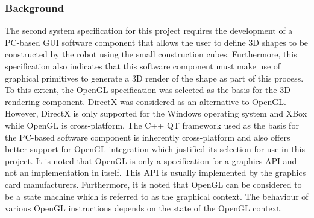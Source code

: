 \subsubsection{Background}

The second system specification for this project requires the development of a PC-based GUI software component that allows the user to define 3D shapes to be constructed by the robot using the small construction cubes. Furthermore, this specification also indicates that this software component must make use of graphical primitives to generate a 3D render of the shape as part of this process. To this extent, the OpenGL specification was selected as the basis for the 3D rendering component. DirectX was considered as an alternative to OpenGL. However, DirectX is only supported for the Windows operating system and XBox while OpenGL is cross-platform. The C++ QT framework used as the basis for the PC-based software component is inherently cross-platform and also offers better support for OpenGL integration which justified its selection for use in this project. It is noted that OpenGL is only a specification for a graphics API and not an implementation in itself. This API is usually implemented by the graphics card manufacturers. Furthermore, it is noted that OpenGL can be considered to be a state machine which is referred to as the graphical context. The behaviour of various OpenGL instructions depends on the state of the OpenGL context.



